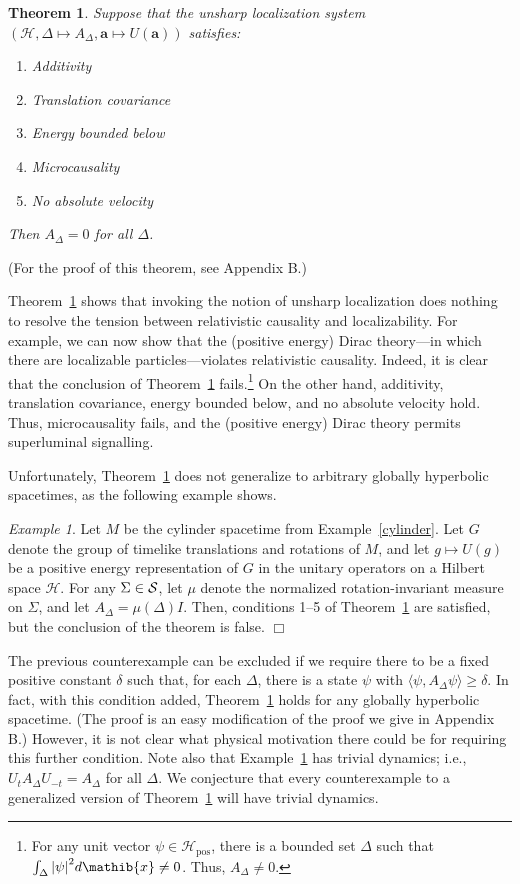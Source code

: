 \documentclass[11pt]{article}
\newtheorem{thm}{Theorem}
\theoremstyle{remark}
\newtheorem{example}{Example}
\newcommand{\abs}[1]{\mbox{$|#1|$}}
\newcommand{\hil}[1]{\mathcal{#1}}
\begin{document}
\begin{thm} Suppose that the unsharp localization system $(\hil{H},\Delta \mapsto
  A_{\Delta},\mathbf{a}\mapsto U(\mathbf{a}))$ satisfies:
  \begin{enumerate}
  \item Additivity 
  \item Translation covariance
  \item Energy bounded below
  \item Microcausality
  \item No absolute velocity
  \end{enumerate} Then $A_{\Delta}=0$ for all $\Delta$.  \label{pov}
\end{thm}
\noindent (For the proof of this theorem, see Appendix B.)  

Theorem~\ref{pov} shows that invoking the notion of unsharp
localization does nothing to resolve the tension between relativistic
causality and localizability.  For example, we can now show that the
(positive energy) Dirac theory---in which there are localizable
particles---violates relativistic causality.  Indeed, it is clear that
the conclusion of Theorem~\ref{pov} fails.\footnote{For any unit
  vector $\psi \in \hil{H}_{\mathrm{pos}}$, there is a bounded set
  $\Delta$ such that $\int _{\Delta}\abs{\psi}^{2}d\mathib{x}\neq 0$.
  Thus, $A_{\Delta}\neq 0$.}  On the other hand, additivity,
translation covariance, energy bounded below, and no absolute velocity
hold.  Thus, microcausality fails, and the (positive energy) Dirac
theory permits superluminal signalling.

Unfortunately, Theorem~\ref{pov} does not generalize to arbitrary
globally hyperbolic spacetimes, as the following example shows.
\begin{example} Let $M$ be the cylinder spacetime from
  Example~\ref{cylinder}.  Let $G$ denote the group of timelike
  translations and rotations of $M$, and let $g\mapsto U(g)$ be a
  positive energy representation of $G$ in the unitary operators on a
  Hilbert space $\hil{H}$.  For any $\Sigma \in \cal{S}$, let $\mu$
  denote the normalized rotation-invariant measure on $\Sigma$, and
  let $A_{\Delta}=\mu (\Delta )I$.  Then, conditions 1--5 of
  Theorem~\ref{pov} are satisfied, but the conclusion of the theorem
  is false.  \hfill $\Box$ \label{measure}
\end{example}

The previous counterexample can be excluded if we require there to be
a fixed positive constant $\delta$ such that, for each $\Delta$, there
is a state $\psi$ with $\langle \psi ,A_{\Delta}\psi \rangle \geq
\delta$.  In fact, with this condition added, Theorem~\ref{pov} holds
for any globally hyperbolic spacetime.  (The proof is an easy
modification of the proof we give in Appendix B.)  However, it is not
clear what physical motivation there could be for requiring this
further condition.  Note also that Example~\ref{measure} has trivial
dynamics; i.e., $U_{t}A_{\Delta}U_{-t}=A_{\Delta}$ for all $\Delta$.
We conjecture that every counterexample to a generalized version of
Theorem~\ref{pov} will have trivial dynamics.
\end{document}
